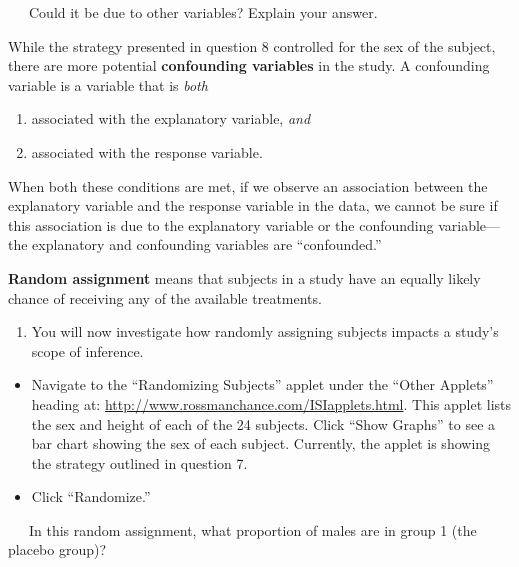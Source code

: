 \documentclass[
]{report}
\providecommand{\tightlist}{%
  \setlength{\itemsep}{0pt}\setlength{\parskip}{0pt}}
\begin{document}
\vspace{0.5in}

~~~Could it be due to other variables? Explain your answer.

\vspace{0.5in}

\newpage

While the strategy presented in question 8 controlled for the sex of the subject, there are more potential \textbf{confounding variables} in the study. A confounding variable is a variable that is \emph{both}

\begin{enumerate}
\def\labelenumi{\arabic{enumi}.}
\tightlist
\item
  associated with the explanatory variable, \emph{and}
\item
  associated with the response variable.
\end{enumerate}

When both these conditions are met, if we observe an association between the explanatory variable and the response variable in the data, we cannot be sure if this association is due to the explanatory variable or the confounding variable---the explanatory and confounding variables are ``confounded.''

\textbf{Random assignment} means that subjects in a study have an equally likely chance of receiving any of the available treatments.

\begin{enumerate}
\def\labelenumi{\arabic{enumi}.}
\setcounter{enumi}{9}
\tightlist
\item
  You will now investigate how randomly assigning subjects impacts a study's scope of inference.
\end{enumerate}

\begin{itemize}
\item
  Navigate to the ``Randomizing Subjects'' applet under the ``Other Applets'' heading at: \url{http://www.rossmanchance.com/ISIapplets.html}. This applet lists the sex and height of each of the 24 subjects. Click ``Show Graphs'' to see a bar chart showing the sex of each subject. Currently, the applet is showing the strategy outlined in question 7.
\item
  Click ``Randomize.''
\end{itemize}

~~~In this random assignment, what proportion of males are in group 1 (the placebo group)?
\end{document}
